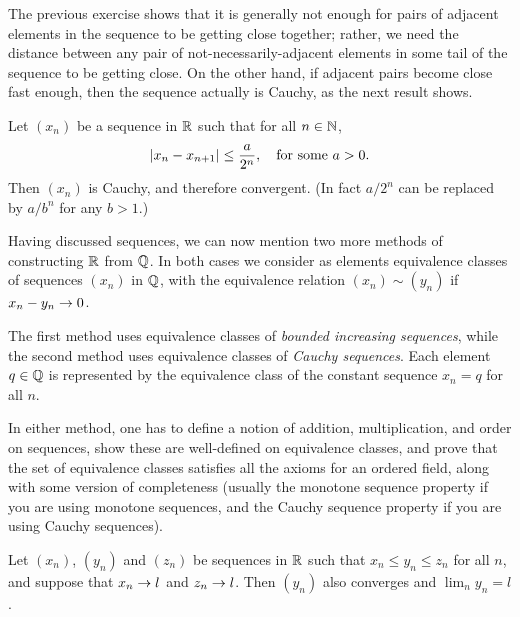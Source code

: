 \documentclass{book}
\begin{document}
\begin{rmk}
The previous exercise shows that it is generally not enough for pairs of
adjacent elements in the sequence to be getting close together; rather, we need the distance between
any pair of not-necessarily-adjacent elements in some tail of the sequence to be getting close.
%
On the other hand, if adjacent pairs become close fast enough, then the sequence actually is Cauchy, as the next
result shows.
\end{rmk}

\begin{lem}
Let $(x_n)$ be a sequence in $\mathbb{R}$ such that for all $n \in \mathbb{N}$,
\[
	\lvert x_n - x_{n+1}\rvert \leq \frac a {2^n},
	\quad \text{for some $a > 0$.}
\]
Then $(x_n)$ is Cauchy, and therefore convergent. (In fact $a/2^n$ can be replaced by $a/b^n$ for any $b > 1$.)
\label{L:suff_cauchy}
\end{lem}


\begin{rmk}
Having discussed sequences, we can now mention two more methods of constructing $\mathbb{R}$ from $\mathbb{Q}$. In both cases we consider as elements 
equivalence classes of sequences $(x_n)$ in $\mathbb{Q}$, with the equivalence relation $(x_n) \sim (y_n)$ if $x_n - y_n \rightarrow 0$.

The first method uses equivalence classes of {\em bounded
increasing sequences}, while the second method uses equivalence classes
of {\em Cauchy sequences}. Each element $q \in \mathbb{Q}$ is represented by the
equivalence class of the constant sequence $x_n = q$ for all $n$. 

In either method, one has to define a notion of addition, multiplication, and order on
sequences, show these are well-defined on equivalence classes, and prove that
the set of equivalence classes satisfies all the axioms for an ordered field,
along with some version of completeness (usually the monotone sequence property
if you are using monotone sequences, and the Cauchy sequence property if you
are using Cauchy sequences).
\end{rmk}

\begin{thm}
Let $(x_n)$, $(y_n)$ and $(z_n)$ be sequences in $\mathbb{R}$ such that $x_n \leq y_n \leq z_n$ for all $n$, and
suppose that $x_n \rightarrow l$ and $z_n \rightarrow l$. Then $(y_n)$ also converges and $\lim_n y_n = l$.
\label{T:squeeze}
\end{thm}
\end{document}
